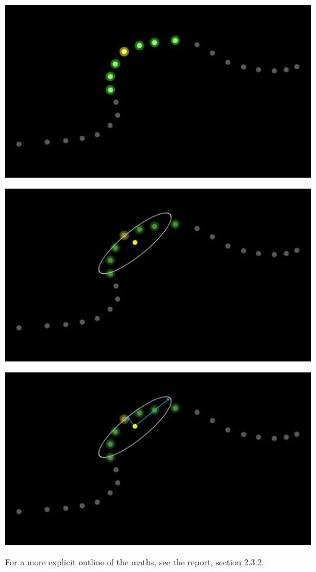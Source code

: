 \documentclass[11pt]{article}
\begin{document}
\begin{center}
\includegraphics[width=.9\linewidth]{./images/pca_expl_line_points_seleceted_neighbors.png}
\end{center}

\begin{center}
\includegraphics[width=.9\linewidth]{./images/pca_expl_line_points_seleceted_mean.png}
\end{center}

\begin{center}
\includegraphics[width=.9\linewidth]{./images/pca_expl_line_points_seleceted_spread.png}
\end{center}

For a more explicit outline of the maths, see the report, section 2.3.2.
\end{document}
